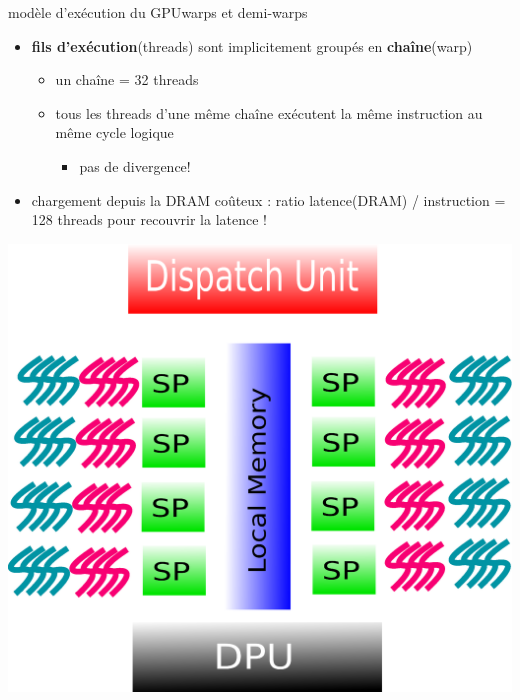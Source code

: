 \documentclass[11pt,mathserif]{beamer}
\newcommand{\gezi}{\faLongArrowRight}
\newcommand{\kontuz}{\faExclamationTriangle}
\begin{document}
\begin{frame}{modèle d'exécution du GPU}{warps et demi-warps}
\begin{minipage}[c]{0.69\linewidth}
\begin{itemize}
  \item {\bf fils d'exécution}(threads) sont implicitement groupés en {\bf chaîne}(warp)
    \begin{itemize}
      \item un chaîne = 32 threads 
      \item tous les threads d'une même chaîne exécutent la même instruction au même cycle logique
        \begin{itemize}
          \item[\kontuz] \alert{pas de divergence!}
        \end{itemize}
    \end{itemize}
  \item chargement depuis la DRAM coûteux : ratio latence(DRAM) / instruction = 128 \gezi 128 threads pour recouvrir la latence !
\end{itemize}
\end{minipage}
\begin{minipage}[c]{0.29\linewidth}
\begin{center}
  \includegraphics[width=0.95\linewidth]{fig/GPUArchi8ThreadDiv.eps}
\end{center}
\end{minipage}
\end{frame}
\end{document}

